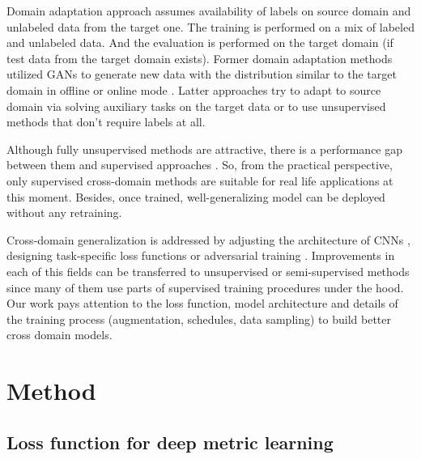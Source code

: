 \documentclass[a4paper,conference]{IEEEtran}
\begin{document}
Domain adaptation approach assumes availability of labels on source domain and
unlabeled data from the target one. The training is performed on a mix of
labeled and unlabeled data. And the evaluation is performed on the target domain
(if test data from the target domain exists).  Former domain adaptation methods
utilized GANs to generate new data with the distribution similar to the target
domain in offline or online mode
\cite{Zhong2018GeneralizingAP,deng2017imageimage,MSMT17}.  Latter approaches try
to adapt to source domain via solving auxiliary tasks on the target data
\cite{Huang2018EANetEA} or to use unsupervised methods
\cite{Fu2018SelfsimilarityGA, yu2017crossview, Fan2017UnsupervisedPR} that don't
require labels at all.

Although fully unsupervised methods are attractive, there is a performance gap
between them and supervised approaches \cite{ye2020deep}.  So, from the
practical perspective, only supervised cross-domain methods are suitable for
real life applications at this moment. Besides, once trained, well-generalizing
model can be deployed without any retraining.

Cross-domain generalization is addressed by adjusting the architecture of CNNs
\cite{zhou2019learning, Jia2019FrustratinglyEP}, designing task-specific loss
functions \cite{inDefenceTriplet2} or adversarial training
\cite{yuan2019calibrated}.  Improvements in each of this fields can be
transferred to unsupervised or semi-supervised methods since many of them use
parts of supervised training procedures under the hood.  Our work pays attention
to the loss function, model architecture and details of the training process
(augmentation, schedules, data sampling) to build better cross domain models.

\section{Method}

\subsection{Loss function for deep metric learning}
\end{document}
